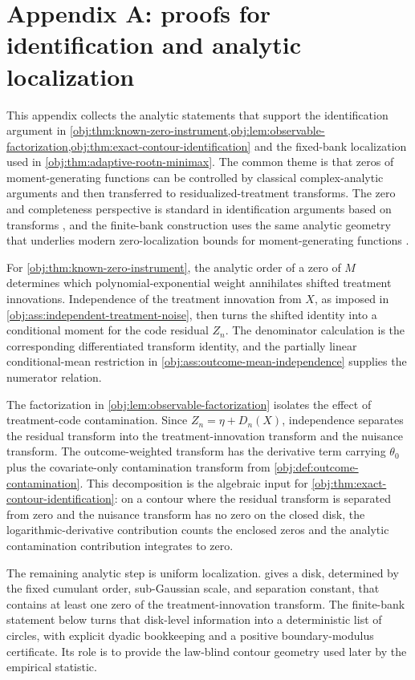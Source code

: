 \section{Appendix A: proofs for identification and analytic localization}

This appendix collects the analytic statements that support the identification argument in \cref{obj:thm:known-zero-instrument,obj:lem:observable-factorization,obj:thm:exact-contour-identification} and the fixed-bank localization used in \cref{obj:thm:adaptive-rootn-minimax}. The common theme is that zeros of moment-generating functions can be controlled by classical complex-analytic arguments and then transferred to residualized-treatment transforms. The zero and completeness perspective is standard in identification arguments based on transforms \citep{KaganLinnikRao1973,Mattner1992}, and the finite-bank construction uses the same analytic geometry that underlies modern zero-localization bounds for moment-generating functions \citep{MichelenSahasrabudhe2019,EremenkoFryntov2021,DinhGhoshTranTran2021}.

For \cref{obj:thm:known-zero-instrument}, the analytic order of a zero of \(M\) determines which polynomial-exponential weight annihilates shifted treatment innovations. Independence of the treatment innovation from \(X\), as imposed in \cref{obj:ass:independent-treatment-noise}, then turns the shifted identity into a conditional moment for the code residual \(Z_n\). The denominator calculation is the corresponding differentiated transform identity, and the partially linear conditional-mean restriction in \cref{obj:ass:outcome-mean-independence} supplies the numerator relation.

The factorization in \cref{obj:lem:observable-factorization} isolates the effect of treatment-code contamination. Since \(Z_n=\eta+D_n(X)\), independence separates the residual transform into the treatment-innovation transform and the nuisance transform. The outcome-weighted transform has the derivative term carrying \(\theta_0\) plus the covariate-only contamination transform from \cref{obj:def:outcome-contamination}. This decomposition is the algebraic input for \cref{obj:thm:exact-contour-identification}: on a contour where the residual transform is separated from zero and the nuisance transform has no zero on the closed disk, the logarithmic-derivative contribution counts the enclosed zeros and the analytic contamination contribution integrates to zero.

The remaining analytic step is uniform localization.  gives a disk, determined by the fixed cumulant order, sub-Gaussian scale, and separation constant, that contains at least one zero of the treatment-innovation transform. The finite-bank statement below turns that disk-level information into a deterministic list of circles, with explicit dyadic bookkeeping and a positive boundary-modulus certificate. Its role is to provide the law-blind contour geometry used later by the empirical statistic.

